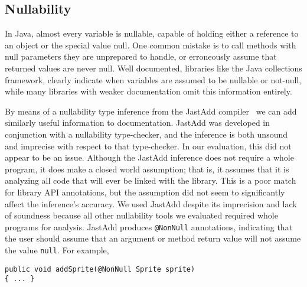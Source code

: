 \subsection{Nullability}
\label{sec:Nullability}

In Java, almost every variable is nullable,
capable of holding either a reference to an object or the
special value null.  One common mistake is to call
methods with null parameters they are unprepared to handle, or erroneously
assume that returned values are never null.  Well documented, libraries like
the Java collections framework, clearly indicate when variables are
assumed to be nullable or not-null, while many libraries with weaker
documentation omit this information entirely.

By means of a nullability type inference from the JastAdd compiler~\cite{NonNullTypeInference} we can add
similarly useful information to documentation.  JastAdd was developed in
conjunction with a nullability type-checker, and the inference is both unsound
and imprecise with respect to that type-checker.  In our evaluation, this did
not appear to be an issue.  Although the JastAdd inference
does not require a whole program, it does make a closed
world assumption; that is, it assumes that it is analyzing all code that will ever be
linked with the library.  This is a poor match for library API annotations, but
the assumption did not seem to significantly affect the inference's accuracy.
We used JastAdd despite its imprecision and lack of soundness
because all other nullability tools we evaluated required whole programs for analysis.
JastAdd produces \texttt{@NonNull} annotations, indicating that the user
should assume that an
argument or method return value will not assume the value \texttt{null}.  For example,

\begin{verbatim}
public void addSprite(@NonNull Sprite sprite)
{ ... }
\end{verbatim}

